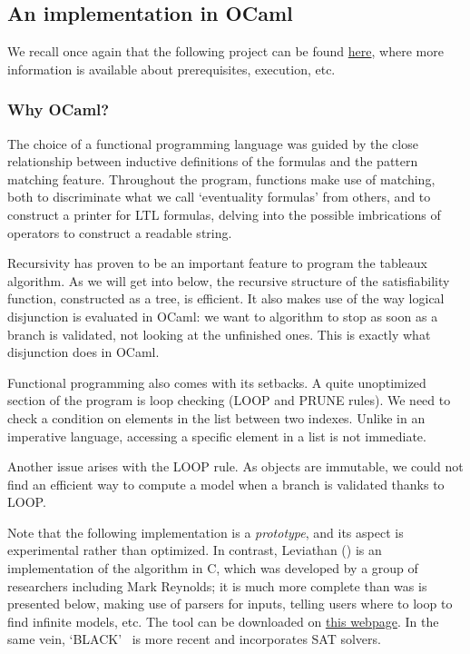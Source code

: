 \documentclass[11pt]{article}
\def\CC{{C\nolinebreak[4]\hspace{-.05em}\raisebox{.4ex}{\tiny\bf ++}}}
\theoremstyle{definition}
\begin{document}
\subsection{An implementation in OCaml}

We recall once again that the following project can be found 
\href{https://github.com/anatcaramba/LTL-SAT-Solver-by-Reynolds-Tableaux}{here},
where more information is available about prerequisites, execution, etc.

\subsubsection*{Why OCaml?}
The choice of a functional programming language was guided by the close relationship
between inductive definitions of the formulas and the pattern matching feature.
Throughout the program, functions make use of matching, both to discriminate
what we call `eventuality formulas' from others, and to construct a printer
for LTL formulas, delving into the possible imbrications of operators to construct
a readable string.

Recursivity has proven to be an important feature to program the tableaux algorithm. 
As we will get into below, the recursive structure of the satisfiability function,
constructed as a tree, is efficient. It also makes use of the way logical disjunction
is evaluated in OCaml: we want to algorithm to stop as soon as a branch is validated,
not looking at the unfinished ones. This is exactly what disjunction does in OCaml.

Functional programming also comes with its setbacks. A quite unoptimized section of 
the program is loop checking (LOOP and PRUNE rules). We need to check a condition on 
elements in the list between two indexes. Unlike in an imperative language, accessing
a specific element in a list is not immediate. 

Another issue arises with the LOOP rule. As objects 
are immutable, we could not find an efficient way to compute a model when a branch is
validated thanks to LOOP. 

Note that the following implementation is a \emph{prototype}, and its aspect is 
experimental rather than optimized. In contrast, Leviathan (\cite{Leviathan})
is an implementation of the algorithm in \CC, which was developed by a group of researchers including Mark Reynolds;
it is much more complete than was is presented below, making use of parsers for inputs,
telling users where to loop to find infinite models, etc. The tool can be downloaded on \href{https://github.com/Corralx/leviathan}{this webpage}.
In the same vein, `BLACK'~\cite{Black21} is more recent and incorporates SAT solvers.
    
\end{document}
